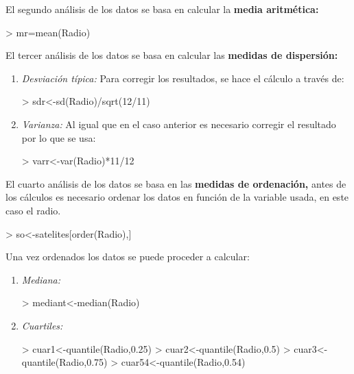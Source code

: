 \documentclass [a4paper] {article}
\begin{document}
\bigskip
El segundo an\'alisis de los datos se basa en calcular la \textbf{media aritm\'etica:}
\begin{Schunk}
\begin{Sinput}
> mr=mean(Radio)
\end{Sinput}
\end{Schunk}

\bigskip
El tercer an\'alisis de los datos se basa en calcular las \textbf{medidas de dispersi\'on:}
\begin{enumerate}
\item
\textit{Desviaci\'on t\'ipica: }Para corregir los resultados, se hace el c\'alculo
a trav\'es de:
\begin{Schunk}
\begin{Sinput}
> sdr<-sd(Radio)/sqrt(12/11)
\end{Sinput}
\end{Schunk}

\item
\textit{Varianza: }Al igual que en el caso anterior es necesario corregir el 
resultado por lo que se usa:
\begin{Schunk}
\begin{Sinput}
> varr<-var(Radio)*11/12
\end{Sinput}
\end{Schunk}
\end{enumerate}

\bigskip
El cuarto an\'alisis de los datos se basa en las \textbf{medidas de ordenaci\'on,} antes de los c\'alculos es necesario ordenar
los datos en funci\'on de la variable usada, en este caso el radio.
\begin{Schunk}
\begin{Sinput}
> so<-satelites[order(Radio),]
\end{Sinput}
\end{Schunk}

\bigskip
Una vez ordenados los datos se puede proceder a calcular:

\begin{enumerate}
\item
\textit{Mediana:}
\begin{Schunk}
\begin{Sinput}
> mediant<-median(Radio)
\end{Sinput}
\end{Schunk}

\item
\textit{Cuartiles:}
\begin{Schunk}
\begin{Sinput}
> cuar1<-quantile(Radio,0.25)
> cuar2<-quantile(Radio,0.5)
> cuar3<-quantile(Radio,0.75)
> cuar54<-quantile(Radio,0.54)
\end{Sinput}
\end{Schunk}
\end{enumerate}
\end{document}
